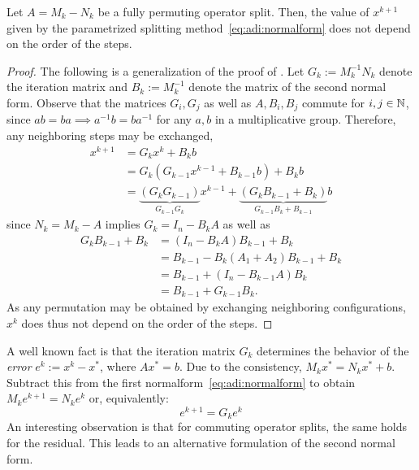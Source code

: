 \begin{proposition}
\label{thm:adi:permutation}
  Let $A = M_k - N_k$ be a fully permuting operator split.
  Then, the value of $x^{k+1}$ given by the parametrized splitting method~\eqref{eq:adi:normalform}
  does not depend on the order of the steps.
\end{proposition}
\begin{proof}
  The following is a generalization of the proof of \cite[Theorem~4.1]{Li2002}.
  Let $G_k := M_k^{-1} N_k$ denote the iteration matrix
  and $B_k := M_k^{-1}$ denote the matrix of the second normal form.
  Observe that the matrices $G_i, G_j$ as well as $A, B_i, B_j$ commute for $i,j\in\mathbb{N}$,
  since $ab=ba \implies a^{-1}b = ba^{-1}$ for any $a,b$ in a multiplicative group.
  Therefore, any neighboring steps may be exchanged,
  \begin{align*}
    x^{k+1}
    &= G_k x^k + B_k b \\
    &= G_k (G_{k-1} x^{k-1} + B_{k-1} b) + B_k b \\
    &= \underbrace{
      (G_k G_{k-1})
    }_{
      G_{k-1} G_k
    } x^{k-1} + \underbrace{
      (G_k B_{k-1} + B_k)
    }_{
      G_{k-1} B_k + B_{k-1}
    } b
  \end{align*}
  since $N_k = M_k - A$ implies $G_k = I_n - B_k A$ as well as
  \begin{align*}
    G_k B_{k-1} + B_k
    &= (I_n - B_k A) B_{k-1} + B_k \\
    &= B_{k-1} - B_k (A_1+A_2) B_{k-1} + B_k \\
    &= B_{k-1} + (I_n - B_{k-1} A) B_k \\
    &= B_{k-1} + G_{k-1} B_k
    .
  \end{align*}
  As any permutation may be obtained by exchanging neighboring configurations,
  $x^k$ does thus not depend on the order of the steps.
\end{proof}

A well known fact is that the iteration matrix $G_k$ determines
the behavior of the \emph{error} $e^k := x^k - x^*$, where $Ax^* = b$.
Due to the consistency, $M_k x^* = N_k x^* + b$.
Subtract this from the first normalform~\eqref{eq:adi:normalform} to obtain
$M_k e^{k+1} = N_k e^k$ or, equivalently:
\begin{equation}
  e^{k+1} = G_k e^k
\end{equation}
An interesting observation is that for commuting operator splits,
the same holds for the residual.
This leads to an alternative formulation of the second normal form.

